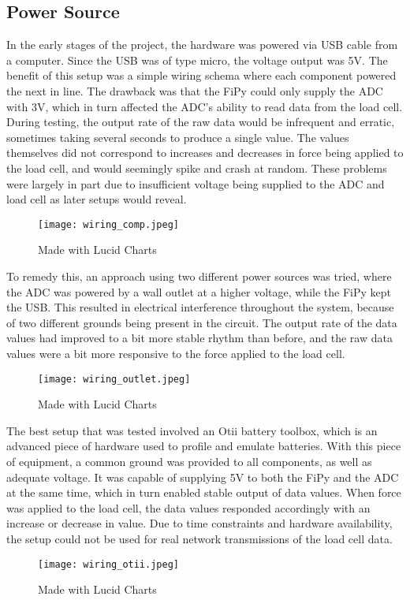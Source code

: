 \subsection{Power Source}
In the early stages of the project, the hardware was powered via USB cable from a computer. Since the USB was of type micro, the voltage output was 5V. The benefit of this setup was a simple wiring schema where each component powered the next in line. The drawback was that the FiPy could only supply the ADC with 3V, which in turn affected the ADC's ability to read data from the load cell. During testing, the output rate of the raw data would be infrequent and erratic, sometimes taking several seconds to produce a single value. The values themselves did not correspond to increases and decreases in force being applied to the load cell, and would seemingly spike and crash at random. These problems were largely in part due to insufficient voltage being supplied to the ADC and load cell as later setups would reveal.
\begin{figure}[h]
	\centering
	\texttt{[image: wiring\_comp.jpeg]}
	\caption{Made with Lucid Charts\cite{lucid-chart}}
	\label{fig:wiring_comp}
\end{figure}

To remedy this, an approach using two different power sources was tried, where the ADC was powered by a wall outlet at a higher voltage, while the FiPy kept the USB. This resulted in electrical interference throughout the system, because of two different grounds being present in the circuit. The output rate of the data values had improved to a bit more stable rhythm than before, and the raw data values were a bit more responsive to the force applied to the load cell. 
\begin{figure}[h]
	\centering
	\texttt{[image: wiring\_outlet.jpeg]}
	\caption{Made with Lucid Charts\cite{lucid-chart}}
	\label{fig:wiring_outlet}
\end{figure}

The best setup that was tested involved an Otii battery toolbox, which is an advanced piece of hardware used to profile and emulate batteries.\cite{otii-web} With this piece of equipment, a common ground was provided to all components, as well as adequate voltage. It was capable of supplying 5V to both the FiPy and the ADC at the same time, which in turn enabled stable output of data values. When force was applied to the load cell, the data values responded accordingly with an increase or decrease in value. Due to time constraints and hardware availability, the setup could not be used for real network transmissions of the load cell data.
\begin{figure}[h]
	\centering
	\texttt{[image: wiring\_otii.jpeg]}
	\caption{Made with Lucid Charts\cite{lucid-chart}}
	\label{fig:wiring_otii}
\end{figure}

